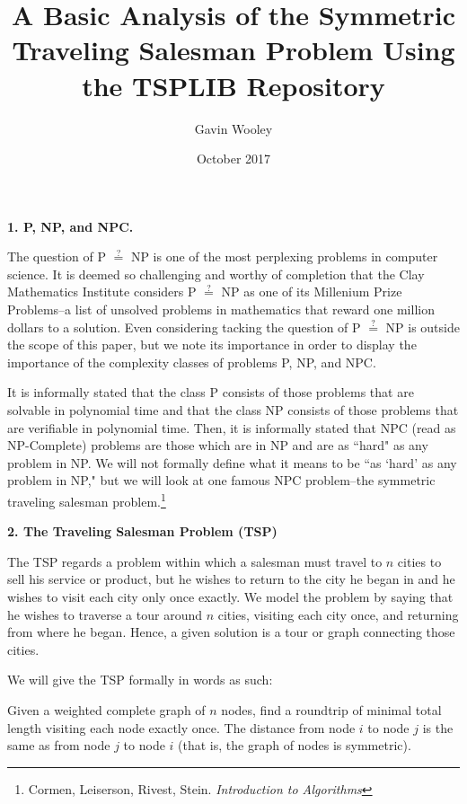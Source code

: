 \documentclass{article}
\title{A Basic Analysis of the Symmetric Traveling Salesman Problem Using the TSPLIB Repository}
\author{Gavin Wooley}
\date{October 2017}
\newenvironment{nscenter}{\parskip=0pt\par\nopagebreak\centering}{\par\noindent\ignorespacesafterend}
\begin{document}
\begin{titlepage}
\maketitle
\end{titlepage}

\textbf{1. P, NP, and NPC.}

\setlength{\parindent}{10ex}
The question of P $\stackrel{?}{=}$ NP is one of the most perplexing problems in computer science. It is deemed so challenging and worthy of completion that the Clay Mathematics Institute considers P $\stackrel{?}{=}$ NP as one of its Millenium Prize Problems--a list of unsolved problems in mathematics that reward one million dollars to a solution. Even considering tacking the question of P $\stackrel{?}{=}$ NP is outside the scope of this paper, but we note its importance in order to display the importance of the complexity classes of problems P, NP, and NPC.\par 

It is informally stated that the class P consists of those problems that are solvable in polynomial time and that the class NP consists of those problems that are verifiable in polynomial time. Then, it is informally stated that NPC (read as NP-Complete) problems are those which are in NP and are as ``hard" as any problem in NP. We will not formally define what it means to be ``as `hard' as any problem in NP," but we will look at one famous NPC problem--the symmetric traveling salesman problem.\footnote{Cormen, Leiserson, Rivest, Stein. \textit{Introduction to Algorithms}}\\\par

\noindent
\textbf{2. The Traveling Salesman Problem (TSP)}

The TSP regards a problem within which a salesman must travel to $n$ cities to sell his service or product, but he wishes to return to the city he began in and he wishes to visit each city only once exactly. We model the problem by saying that he wishes to traverse a tour around $n$ cities, visiting each city once, and returning from where he began. Hence, a given solution is a tour or graph connecting those cities.\par

We will give the TSP formally in words as such:
\begin{framed}
\noindent
\begin{nscenter}
Given a weighted complete graph of $n$ nodes, find a roundtrip of minimal total length visiting each node exactly once. The distance from node $i$ to node $j$ is the same as from node $j$ to node $i$ (that is, the graph of nodes is symmetric).
\end{nscenter}
\end{framed}
\end{document}
